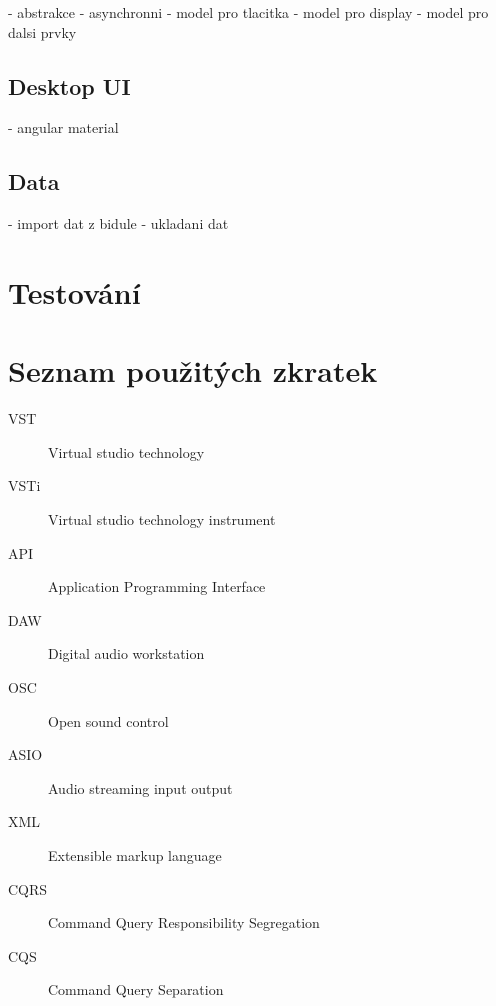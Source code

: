 \documentclass[thesis=M,czech]{FITthesis}[2019/03/06]
\begin{document}
		- abstrakce
		- asynchronni
		- model pro tlacitka
		- model pro display
		- model pro dalsi prvky
	
	\section{Desktop UI}
		- angular material
		
	\section{Data}

		- import dat z bidule
		- ukladani dat


\chapter{Testování}

\begin{conclusion}
\end{conclusion}




\appendix

\chapter{Seznam použitých zkratek}
\begin{description}
	\item[VST] Virtual studio technology
	\item[VSTi] Virtual studio technology instrument
	\item[API] Application Programming Interface
	\item[DAW] Digital audio workstation
	\item[OSC] Open sound control
	\item[ASIO] Audio streaming input output
	\item[XML] Extensible markup language
	\item[CQRS] Command Query Responsibility Segregation
	\item[CQS] Command Query Separation
\end{description}
\end{document}

